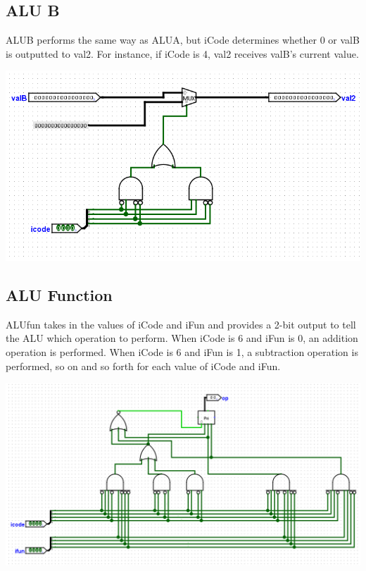 \documentclass{article}
\begin{document}
\subsection{ALU B}
ALUB performs the same way as ALUA, but iCode determines whether 0 or valB is outputted to val2. For instance, if iCode is 4, val2 receives valB's current value. 
\begin{center}
    \includegraphics[scale=.7]{alu_b.png} \\
\end{center}
\subsection{ALU Function}
ALUfun takes in the values of iCode and iFun and provides a 2-bit output to tell the ALU which operation to perform. When iCode is 6 and iFun is 0, an addition operation is performed. When iCode is 6 and iFun is 1, a subtraction operation is performed, so on and so forth for each value of iCode and iFun. 
\begin{center}
    \includegraphics[scale=.6]{alu_fun.png} \\
\end{center}
\end{document}
